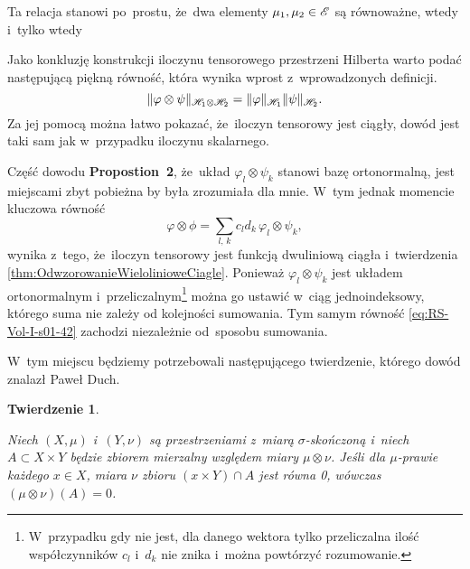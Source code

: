 \documentclass[a4paper,11pt]{article}
\newtheorem{theorem}{Twierdzenie} %
\begin{document}
Ta relacja stanowi po~prostu, że~dwa elementy
$\mu_{ 1 }, \mu_{ 2 } \in \mathcal{E}$ są równoważne, wtedy i~tylko wtedy

\vspace{\spaceFour}



\start {} Jako konkluzję konstrukcji iloczynu tensorowego
przestrzeni Hilberta warto podać następującą piękną równość, która
wynika wprost z~wprowadzonych definicji.
\begin{equation}
  \label{eq:RS-Vol-I-s01-41}
  \lVert{  \varphi \otimes \psi  }\rVert_{ \mathcal{H}_{ 1 } \otimes \mathcal{H}_{ 2 } }
  = \lVert{  \varphi  }\rVert_{ \mathcal{H}_{ 1 } } \lVert{  \psi  }\rVert_{ \mathcal{H}_{ 2 } }.
\end{equation}
Za jej pomocą można łatwo pokazać, że~iloczyn tensorowy jest ciągły,
dowód jest taki sam jak w~przypadku iloczynu skalarnego. %

\vspace{\spaceFour}



\start {} Część dowodu \textbf{Propostion~2}, że~układ
$\varphi_{ l } \otimes \psi_{ k }$ stanowi bazę ortonormalną, jest miejscami
zbyt pobieżna by była zrozumiała dla mnie. W~tym jednak momencie
kluczowa równość
\begin{equation}
  \label{eq:RS-Vol-I-s01-42}
  \varphi \otimes \phi = \sum_{ l,\, k } c_{ l } d_{ k }\, \varphi_{ l } \otimes \psi_{ k },
\end{equation}
wynika z~tego, że~iloczyn tensorowy jest funkcją dwuliniową ciągła
i~twierdzenia \eqref{thm:OdwzorowanieWielolinioweCiagle}. Ponieważ
$\varphi_{ l } \otimes \psi_{ k }$ jest układem ortonormalnym
i~przeliczalnym\footnote{W~przypadku gdy nie jest, dla danego wektora
  tylko przeliczalna ilość współczynników $c_{ l }$ i~$d_{ k }$ nie
  znika i~można powtórzyć rozumowanie.} można go ustawić w~ciąg
jednoindeksowy, którego suma nie zależy od kolejności sumowania. Tym
samym równość \eqref{eq:RS-Vol-I-s01-42} zachodzi niezależnie od~sposobu
sumowania.

\vspace{\spaceFour}



\start {} W~tym miejscu będziemy potrzebowali następującego
twierdzenie, którego dowód znalazł Paweł Duch.





\begin{theorem}
  \label{thm:TwierdzenieOIloczynieMiarPWZerowym}

  Niech $( X, \mu )$ i~$( Y, \nu )$ są przestrzeniami z~miarą
  $\sigma$-skończoną i~niech $A \subset X \times Y$ będzie zbiorem
  mierzalny względem miary $\mu \otimes \nu$. Jeśli dla $\mu$-prawie
  każdego $x \in X$, miara $\nu$ zbioru $( x \times Y ) \cap A$ jest
  równa 0, wówczas $(\mu \otimes \nu)( A ) = 0$.

\end{theorem}
\end{document}
